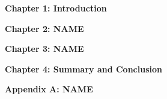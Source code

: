 \textbf{Chapter 1: Introduction} \quad
\lipsum[1][1-3]

\textbf{Chapter 2: NAME} \quad
\lipsum[2][1-3]

\textbf{Chapter 3: NAME} \quad
\lipsum[3][1-3]

\textbf{Chapter 4: Summary and Conclusion} \quad
\lipsum[4][1-3]

\textbf{Appendix A: NAME} \quad
\lipsum[5][1-3]